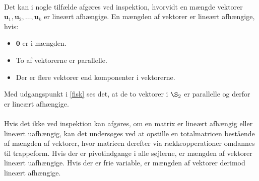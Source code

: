 \\
%
%
Det kan i nogle tilfælde afgøres ved inspektion, hvorvidt en mængde vektorer $\mathbf{u}_1,\mathbf{u}_2,\ldots ,\mathbf{u}_k$ er lineært afhængige. 
En mængden af vektorer er lineært afhængige, hvis:
%
\begin{itemize}
\item $\mathbf{0}$ er i mængden.
\item To af vektorerne er parallelle.
\item Der er flere vektorer end komponenter i vektorerne. 
\end{itemize}
%
Med udgangspunkt i \ref{fisk} ses det, at de to vektorer i $\S_2$ er parallelle og derfor er lineært afhængige. 
\\\\
Hvis det ikke ved inspektion kan afgøres, om en matrix er lineært afhængig eller lineært uafhængig, kan det undersøges ved at opstille en totalmatricen bestående af mængden af vektorer, hvor matricen derefter via rækkeopperationer omdannes til trappeform. 
Hvis der er pivotindgange i alle søjlerne, er mængden af vektorer lineært uafhængige. Hvis der er frie variable, er mængden af vektorer derimod lineært afhængige.
\\\\
\newpage
\noindent
%
